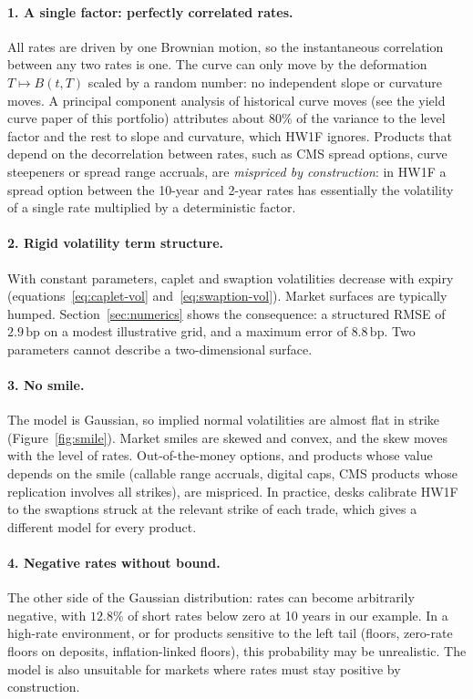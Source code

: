 \documentclass[11pt,a4paper]{article}
\theoremstyle{plain}
\theoremstyle{definition}
\newcommand{\bp}{\,\mathrm{bp}}
\begin{document}
\paragraph{1. A single factor: perfectly correlated rates.} All rates are driven by one Brownian motion, so the instantaneous correlation between any two rates is one. The curve can only move by the deformation $T\mapsto B(t,T)$ scaled by a random number: no independent slope or curvature moves. A principal component analysis of historical curve moves (see the yield curve paper of this portfolio) attributes about $80\%$ of the variance to the level factor and the rest to slope and curvature, which HW1F ignores. Products that depend on the decorrelation between rates, such as CMS spread options, curve steepeners or spread range accruals, are \emph{mispriced by construction}: in HW1F a spread option between the 10-year and 2-year rates has essentially the volatility of a single rate multiplied by a deterministic factor.

\paragraph{2. Rigid volatility term structure.} With constant parameters, caplet and swaption volatilities decrease with expiry (equations~\eqref{eq:caplet-vol} and~\eqref{eq:swaption-vol}). Market surfaces are typically humped. Section~\ref{sec:numerics} shows the consequence: a structured RMSE of $2.9\bp$ on a modest illustrative grid, and a maximum error of $8.8\bp$. Two parameters cannot describe a two-dimensional surface.

\paragraph{3. No smile.} The model is Gaussian, so implied normal volatilities are almost flat in strike (Figure~\ref{fig:smile}). Market smiles are skewed and convex, and the skew moves with the level of rates. Out-of-the-money options, and products whose value depends on the smile (callable range accruals, digital caps, CMS products whose replication involves all strikes), are mispriced. In practice, desks calibrate HW1F to the swaptions struck at the relevant strike of each trade, which gives a different model for every product.

\paragraph{4. Negative rates without bound.} The other side of the Gaussian distribution: rates can become arbitrarily negative, with $12.8\%$ of short rates below zero at 10 years in our example. In a high-rate environment, or for products sensitive to the left tail (floors, zero-rate floors on deposits, inflation-linked floors), this probability may be unrealistic. The model is also unsuitable for markets where rates must stay positive by construction.
\end{document}
